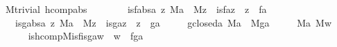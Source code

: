 \begin{isabellebody}
\isanewline
{}\isamarkupfalse%
\ {\isacharparenleft}{\kern0pt}\ M{\isacharunderscore}{\kern0pt}trivial{\isacharparenright}{\kern0pt}\ hcomp{\isacharunderscore}{\kern0pt}abs{\isacharcolon}{\kern0pt}\ \isanewline
\ \ \isanewline
\ \ \ \ is{\isacharunderscore}{\kern0pt}f{\isacharunderscore}{\kern0pt}abs{\isacharcolon}{\kern0pt}{\isachardoublequoteopen}{\isasymAnd}a\ z{\isachardot}{\kern0pt}\ M{\isacharparenleft}{\kern0pt}a{\isacharparenright}{\kern0pt}\ {\isasymLongrightarrow}\ M{\isacharparenleft}{\kern0pt}z{\isacharparenright}{\kern0pt}\ {\isasymLongrightarrow}\ is{\isacharunderscore}{\kern0pt}f{\isacharparenleft}{\kern0pt}a{\isacharcomma}{\kern0pt}z{\isacharparenright}{\kern0pt}\ {\isasymlongleftrightarrow}\ z\ {\isacharequal}{\kern0pt}\ f{\isacharparenleft}{\kern0pt}a{\isacharparenright}{\kern0pt}{\isachardoublequoteclose}\ \isanewline
\ \ \ \ is{\isacharunderscore}{\kern0pt}g{\isacharunderscore}{\kern0pt}abs{\isacharcolon}{\kern0pt}{\isachardoublequoteopen}{\isasymAnd}a\ z{\isachardot}{\kern0pt}\ M{\isacharparenleft}{\kern0pt}a{\isacharparenright}{\kern0pt}\ {\isasymLongrightarrow}\ M{\isacharparenleft}{\kern0pt}z{\isacharparenright}{\kern0pt}\ {\isasymLongrightarrow}\ is{\isacharunderscore}{\kern0pt}g{\isacharparenleft}{\kern0pt}a{\isacharcomma}{\kern0pt}z{\isacharparenright}{\kern0pt}\ {\isasymlongleftrightarrow}\ z\ {\isacharequal}{\kern0pt}\ g{\isacharparenleft}{\kern0pt}a{\isacharparenright}{\kern0pt}{\isachardoublequoteclose}\ \isanewline
\ \ \ \ g{\isacharunderscore}{\kern0pt}closed{\isacharcolon}{\kern0pt}{\isachardoublequoteopen}{\isasymAnd}a{\isachardot}{\kern0pt}\ M{\isacharparenleft}{\kern0pt}a{\isacharparenright}{\kern0pt}\ {\isasymLongrightarrow}\ M{\isacharparenleft}{\kern0pt}g{\isacharparenleft}{\kern0pt}a{\isacharparenright}{\kern0pt}{\isacharparenright}{\kern0pt}{\isachardoublequoteclose}\ \isanewline
\ \ \ \ {\isachardoublequoteopen}M{\isacharparenleft}{\kern0pt}a{\isacharparenright}{\kern0pt}{\isachardoublequoteclose}\ {\isachardoublequoteopen}M{\isacharparenleft}{\kern0pt}w{\isacharparenright}{\kern0pt}{\isachardoublequoteclose}\ \isanewline
\ \ \isanewline
\ \ \ \ {\isachardoublequoteopen}is{\isacharunderscore}{\kern0pt}hcomp{\isacharparenleft}{\kern0pt}M{\isacharcomma}{\kern0pt}is{\isacharunderscore}{\kern0pt}f{\isacharcomma}{\kern0pt}is{\isacharunderscore}{\kern0pt}g{\isacharcomma}{\kern0pt}a{\isacharcomma}{\kern0pt}w{\isacharparenright}{\kern0pt}\ {\isasymlongleftrightarrow}\ w\ {\isacharequal}{\kern0pt}\ f{\isacharparenleft}{\kern0pt}g{\isacharparenleft}{\kern0pt}a{\isacharparenright}{\kern0pt}{\isacharparenright}{\kern0pt}{\isachardoublequoteclose}\ \isanewline

\end{isabellebody}
